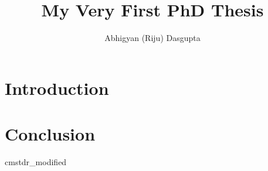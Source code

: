 \documentclass [PhD] {uclathes}
\title          {My Very First PhD Thesis}
\author         {Abhigyan (Riju) Dasgupta}
\begin{document}
\makeintropages


\chapter{Introduction}







\chapter{Conclusion}

\appendix





 {cmstdr_modified}
\end{document}
